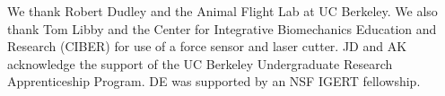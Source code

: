 \documentclass{jfm}
\begin{document}





We thank Robert Dudley and the Animal Flight Lab at UC Berkeley.  We also thank Tom Libby and the Center for Integrative Biomechanics Education and Research (CIBER) for use of a force sensor and laser cutter.  JD and AK acknowledge the support of the UC Berkeley Undergraduate Research Apprenticeship Program.  DE was supported by an NSF IGERT fellowship. 
\end{document}
